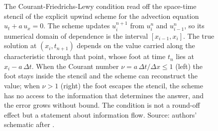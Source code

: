 \begin{figure}[ht]
\begin{tikzpicture}[x=1.0cm, y=1.0cm, font=\footnotesize]
\end{tikzpicture}
\caption[The CFL condition as a domain-of-dependence constraint]{The
Courant-Friedrichs-Lewy condition read off the space-time stencil of the
explicit upwind scheme for the advection equation $u_{t} + a\,u_{x} = 0$.
The scheme updates $u_{i}^{n+1}$ from $u_{i}^{n}$ and $u_{i-1}^{n}$, so
its numerical domain of dependence is the interval $[x_{i-1}, x_{i}]$.
The true solution at $(x_{i}, t_{n+1})$ depends on the value carried
along the characteristic through that point, whose foot at time $t_{n}$
lies at $x_{i} - a\,\Delta t$. When the Courant number $\nu = a\,\Delta
t/\Delta x \leq 1$ (left) the foot stays inside the stencil and the
scheme can reconstruct the value; when $\nu > 1$ (right) the foot escapes
the stencil, the scheme has no access to the information that determines
the answer, and the error grows without bound. The condition is not a
round-off effect but a statement about information flow.
Source: authors' schematic after \cite{text:v2ch16-courant-friedrichs-lewy-1928}.}
\label{fig:vol02ch16:cfl-condition}
\end{figure}
